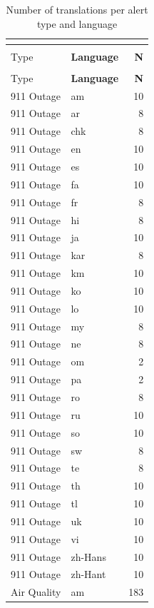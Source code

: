 \begin{longtable}{p{3cm} p{3cm} r}
\caption{Number of translations per alert type and language} \\
\label{tab:translations_full} \\
\hline
\textbf{Alert\\Type} & \textbf{Language} & \textbf{N} \\
\hline
\endfirsthead

\hline
\textbf{Alert\\Type} & \textbf{Language} & \textbf{N} \\
\hline
\endhead

\hline
\endfoot

\hline
\endlastfoot

911 Outage & am & 10 \\
911 Outage & ar & 8 \\
911 Outage & chk & 8 \\
911 Outage & en & 10 \\
911 Outage & es & 10 \\
911 Outage & fa & 10 \\
911 Outage & fr & 8 \\
911 Outage & hi & 8 \\
911 Outage & ja & 10 \\
911 Outage & kar & 8 \\
911 Outage & km & 10 \\
911 Outage & ko & 10 \\
911 Outage & lo & 10 \\
911 Outage & my & 8 \\
911 Outage & ne & 8 \\
911 Outage & om & 2 \\
911 Outage & pa & 2 \\
911 Outage & ro & 8 \\
911 Outage & ru & 10 \\
911 Outage & so & 10 \\
911 Outage & sw & 8 \\
911 Outage & te & 8 \\
911 Outage & th & 10 \\
911 Outage & tl & 10 \\
911 Outage & uk & 10 \\
911 Outage & vi & 10 \\
911 Outage & zh-Hans & 10 \\
911 Outage & zh-Hant & 10 \\
Air Quality & am & 183 \\

\end{longtable}
